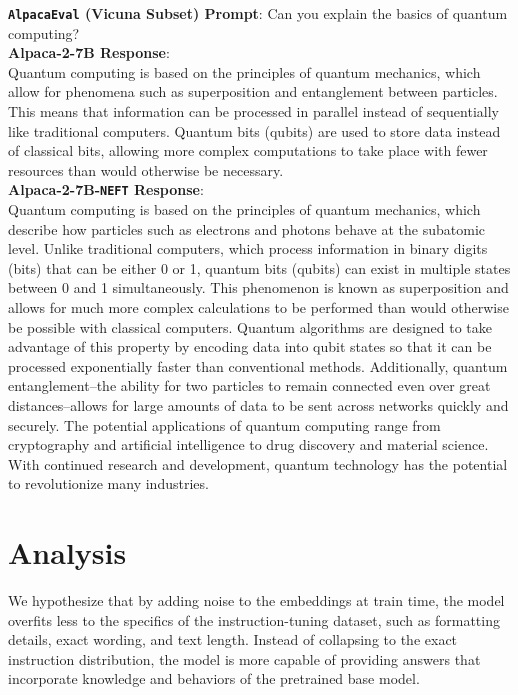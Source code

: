 \documentclass{article} %
\newcommand{\neft}{\texttt{NEFT}}
\begin{document}
\begin{tcolorbox}[boxrule=0pt] 
  \textbf{\texttt{AlpacaEval} (Vicuna Subset) Prompt}: Can you explain the basics of quantum computing?\\
  \textbf{Alpaca-2-7B Response}: \\Quantum computing is based on the principles of quantum mechanics, which allow for phenomena such as superposition and entanglement between particles. This means that information can be processed in parallel instead of sequentially like traditional computers. Quantum bits (qubits) are used to store data instead of classical bits, allowing more complex computations to take place with fewer resources than would otherwise be necessary. \\
  \textbf{Alpaca-2-7B-\neft{} Response}:\\Quantum computing is based on the principles of quantum mechanics, which describe how particles such as electrons and photons behave at the subatomic level. Unlike traditional computers, which process information in binary digits (bits) that can be either 0 or 1, quantum bits (qubits) can exist in multiple states between 0 and 1 simultaneously. This phenomenon is known as superposition and allows for much more complex calculations to be performed than would otherwise be possible with classical computers. Quantum algorithms are designed to take advantage of this property by encoding data into qubit states so that it can be processed exponentially faster than conventional methods. Additionally, quantum entanglement--the ability for two particles to remain connected even over great distances--allows for large amounts of data to be sent across networks quickly and securely. The potential applications of quantum computing range from cryptography and artificial intelligence to drug discovery and material science. With continued research and development, quantum technology has the potential to revolutionize many industries. \\
\end{tcolorbox}

\section{Analysis} \label{sec:discussion_analysis}
We hypothesize that by adding noise to the embeddings at train time, the model overfits less to the specifics of the instruction-tuning dataset, such as formatting details, exact wording, and text length. Instead of collapsing to the exact instruction distribution, the model is more capable of providing answers that incorporate knowledge and behaviors of the pretrained base model.
\end{document}
